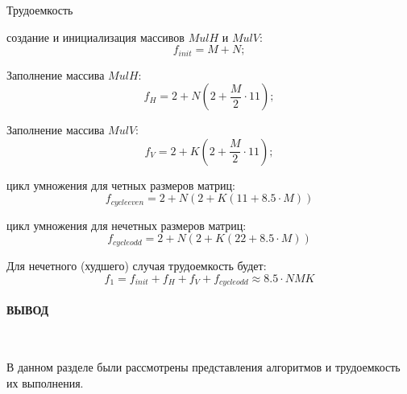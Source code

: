 Трудоемкость
\begin{itemize}
    \itemm создание и инициализация массивов $MulH$ и $MulV$:
    \begin{equation}
        f_{init} = M + N;
    \end{equation}

    \itemm Заполнение массива $MulH$:
     \begin{equation}
        f_H = 2 + N(2 + \frac{M}{2}\cdot 11);
    \end{equation}

    \itemm Заполнение массива $MulV$:
     \begin{equation}
        f_V = 2 + K(2 + \frac{M}{2}\cdot 11);
    \end{equation}

    \itemm цикл умножения для четных размеров матриц:
    \begin{equation}
        f_{cycle even} = 2 + N(2 + K(11 + 8.5\cdot M))
    \end{equation}

    \itemm цикл умножения для нечетных размеров матриц:
    \begin{equation}
        f_{cycle odd} = 2 + N(2 + K(22 + 8.5\cdot M))
    \end{equation}

\end{itemize}

Для нечетного (худшего) случая трудоемкость будет:
\begin{equation}
    f_{1} = f_{init} + f_H + f_V + f_{cycle odd} \approx 8.5\cdot NMK
\end{equation}

\paragraph*{ВЫВОД} ${}$ \newline

В данном разделе были рассмотрены представления алгоритмов и трудоемкость их выполнения.

